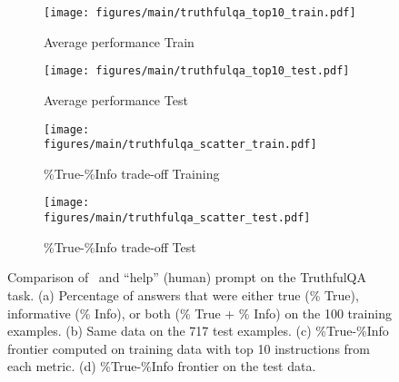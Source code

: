 {\begin{figure}
  \vspace{-0.25in}
  \centering
\begin{subfigure}[b]{0.245\textwidth}
  \captionsetup{justification=centering}
  \hfill\texttt{[image: figures/main/truthfulqa\_top10\_train.pdf]}
  \caption{Average performance Train}
\end{subfigure}
\begin{subfigure}[b]{0.245\textwidth}
  \captionsetup{justification=centering}
  \hfill\texttt{[image: figures/main/truthfulqa\_top10\_test.pdf]}
  \caption{Average performance Test}
\end{subfigure}
\begin{subfigure}[b]{0.245\textwidth}
  \captionsetup{justification=centering}
  \hfill\texttt{[image: figures/main/truthfulqa\_scatter\_train.pdf]}
  \vspace{-1.6em}
  \caption{\%True-\%Info trade-off Training}
\end{subfigure}
\begin{subfigure}[b]{0.245\textwidth}
  \captionsetup{justification=centering}
  \hfill\texttt{[image: figures/main/truthfulqa\_scatter\_test.pdf]}
  \vspace{-1.6em}
  \caption{\%True-\%Info trade-off Test}
\end{subfigure} \vspace{-0.15in}
  \caption{Comparison of \algname~and ``help'' (human) prompt on the TruthfulQA task. (a) Percentage of answers that were either true (\% True), informative (\% Info), or both (\% True + \% Info) on the 100 training examples. (b) Same data on the 717 test examples. (c) \%True-\%Info frontier computed on training data with top 10 instructions from each metric. (d) \%True-\%Info frontier on the test data. }\label{fig:truthfulqa}
\end{figure}

}
